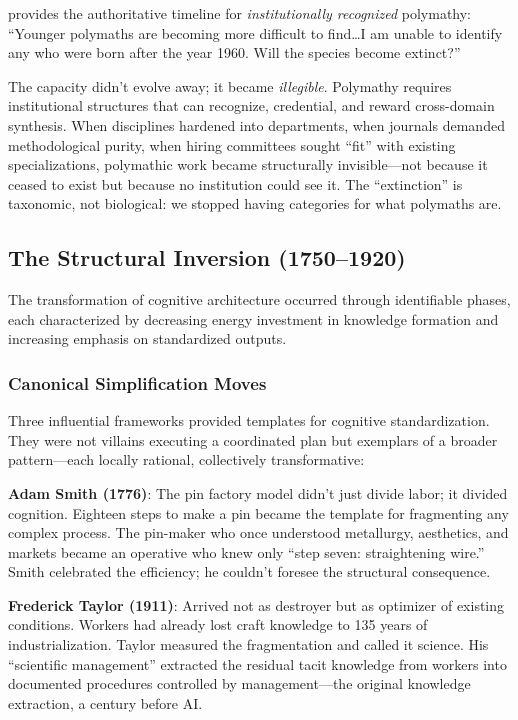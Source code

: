 \citet[p.~284]{burke2020} provides the authoritative timeline for \textit{institutionally recognized} polymathy: ``Younger polymaths are becoming more difficult to find\ldots I am unable to identify any who were born after the year 1960. Will the species become extinct?''

The capacity didn't evolve away; it became \textit{illegible}. Polymathy requires institutional structures that can recognize, credential, and reward cross-domain synthesis. When disciplines hardened into departments, when journals demanded methodological purity, when hiring committees sought ``fit'' with existing specializations, polymathic work became structurally invisible---not because it ceased to exist but because no institution could see it. The ``extinction'' is taxonomic, not biological: we stopped having categories for what polymaths are.

\subsection{The Structural Inversion (1750--1920)}

The transformation of cognitive architecture occurred through identifiable phases, each characterized by decreasing energy investment in knowledge formation and increasing emphasis on standardized outputs.

\subsubsection{Canonical Simplification Moves}

Three influential frameworks provided templates for cognitive standardization. They were not villains executing a coordinated plan but exemplars of a broader pattern---each locally rational, collectively transformative:

\textbf{Adam Smith (1776)}: The pin factory model didn't just divide labor; it divided cognition. Eighteen steps to make a pin became the template for fragmenting any complex process. The pin-maker who once understood metallurgy, aesthetics, and markets became an operative who knew only ``step seven: straightening wire.'' Smith celebrated the efficiency; he couldn't foresee the structural consequence.

\textbf{Frederick Taylor (1911)}: Arrived not as destroyer but as optimizer of existing conditions. Workers had already lost craft knowledge to 135 years of industrialization. Taylor measured the fragmentation and called it science. His ``scientific management'' extracted the residual tacit knowledge from workers into documented procedures controlled by management---the original knowledge extraction, a century before AI.

